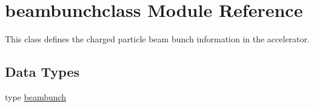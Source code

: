 \hypertarget{namespacebeambunchclass}{}\section{beambunchclass Module Reference}
\label{namespacebeambunchclass}


This class defines the charged particle beam bunch information in the accelerator.  


\subsection*{Data Types}
\begin{DoxyCompactItemize}
\item 
type \mbox{\hyperlink{namespacebeambunchclass_structbeambunchclass_1_1beambunch}{beambunch}}
\end{DoxyCompactItemize}
